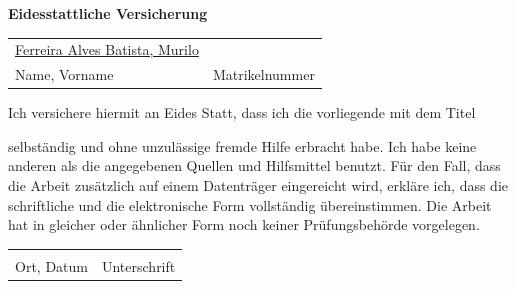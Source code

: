 
\begingroup
\thispagestyle{empty}
\begin{center}
	\large
	\textbf{Eidesstattliche Versicherung}
\end{center}

\vspace{0.5cm}

\begin{tabular}{@{}p{8cm}p{5.8cm}}
	\underline{Ferreira Alves Batista, Murilo} & \underline{\makebox[5.8cm][l]{461286}} \\
	\vspace{0.02cm}Name, Vorname & \vspace{0.02cm}Matrikelnummer \\
\end{tabular}
\vspace{0.5cm}

Ich versichere hiermit an Eides Statt, dass ich die vorliegende {\thesistypegerman} mit dem Titel

{\makeatletter{\emph{{\@title}}}\makeatother}

selbständig und ohne unzulässige fremde Hilfe erbracht habe. Ich habe keine anderen als die angegebenen Quellen und Hilfsmittel benutzt. Für den Fall, dass die Arbeit zusätzlich auf einem Datenträger eingereicht wird, erkläre ich, dass die schriftliche und die elektronische Form vollständig übereinstimmen. Die Arbeit hat in gleicher oder ähnlicher Form noch keiner Prüfungsbehörde vorgelegen.

\vspace{0.3cm}

\begin{tabular}{@{}p{8cm}p{5.8cm}}
	\underline{\smash{Aachen, den \today}} & \underline{\hspace{5.8cm}}\\
	\vspace{0.02cm}Ort, Datum & \vspace{0.02cm}Unterschrift \\
\end{tabular}

\vspace{1cm}


